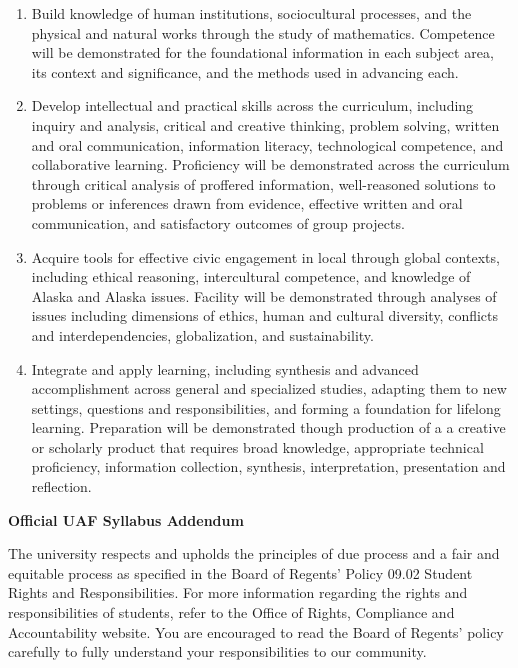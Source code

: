 \documentclass[12pt]{article}
\begin{document}
\begin{enumerate}
\item Build knowledge of human institutions, sociocultural processes, and the physical and natural works through the study of mathematics.  Competence will be demonstrated for the foundational information in each subject area, its context and significance, and the methods used in advancing each.

\item Develop intellectual and practical skills across the curriculum, including inquiry and analysis, critical and creative thinking, problem solving, written and oral communication, information literacy, technological competence, and collaborative learning. Proficiency will be demonstrated across the curriculum through critical analysis of proffered information, well-reasoned solutions to problems or inferences drawn from evidence, effective written and oral communication, and satisfactory outcomes of group projects.

\item Acquire tools for effective civic engagement in local through global contexts, including ethical reasoning, intercultural competence, and knowledge of Alaska and Alaska issues.  Facility will be demonstrated through analyses of issues including dimensions of ethics, human and cultural diversity, conflicts and interdependencies, globalization, and sustainability.   

\item Integrate and apply learning, including synthesis and advanced accomplishment across general and specialized studies, adapting them to new settings, questions and responsibilities, and forming a foundation for lifelong learning. Preparation will be demonstrated though production of a a creative or scholarly product that requires broad knowledge, appropriate technical proficiency, information collection, synthesis, interpretation, presentation and reflection.
\end{enumerate}


\begin{center}
\textbf{\large{Official UAF Syllabus Addendum}}
\end{center}


 The university respects and upholds the principles of due process and a fair and equitable process as specified in the Board of Regents' Policy 09.02 Student Rights and Responsibilities. For more information regarding the rights and responsibilities of students, refer to the Office of Rights, Compliance and Accountability website. You are encouraged to read the Board of Regents' policy carefully to fully understand your responsibilities to our community.
\end{document}
